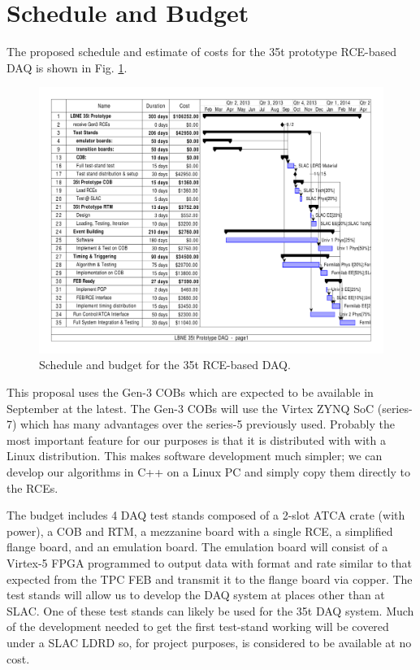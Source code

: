 \section{Schedule and Budget}

The proposed schedule and estimate of costs for the 35t prototype RCE-based DAQ is shown in Fig. \ref{fig:budget35t}.  

\begin{figure}[htb]
\includegraphics[scale=0.8,angle=90]{project-gantt.pdf}
\caption{Schedule and budget for the 35t RCE-based DAQ.}
\label{fig:budget35t}
\end{figure} 

This proposal uses the Gen-3 COBs which are expected to be available in September   at the latest.  The Gen-3 COBs will use the Virtex ZYNQ SoC (series-7) which has many advantages over the series-5 previously used.  Probably the most important feature for our purposes is that it is distributed with with a Linux distribution.  This makes software development much simpler; we can develop our algorithms in C++ on a Linux PC and simply copy them directly to the RCEs.  

The budget includes 4 DAQ test stands composed of a 2-slot ATCA crate (with power), a COB and RTM, a mezzanine board with a single RCE, a simplified flange board, and an emulation board.  The emulation board will consist of a Virtex-5 FPGA programmed to output data with format and rate  similar to that expected from the TPC FEB and transmit it to the flange board via copper.  The test stands will allow us to develop the DAQ system at places other than at SLAC.  One of these test stands can likely be used for the 35t DAQ system.    Much of the development needed to get the first test-stand working will be covered under a SLAC LDRD so, for project purposes, is considered to be available at no cost.  

